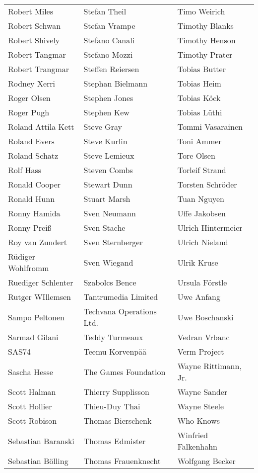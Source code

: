 \begin{small}
\begin{tabular}{p{4cm}p{4cm}p{4cm}}
Robert Miles & Stefan Theil & Timo Weirich \\
Robert Schwan & Stefan Vrampe & Timothy Blanks \\
Robert Shively & Stefano Canali & Timothy Henson \\
Robert Tangmar & Stefano Mozzi & Timothy Prater \\
Robert Trangmar & Steffen Reiersen & Tobias Butter \\
Rodney Xerri & Stephan Bielmann & Tobias Heim \\
Roger Olsen & Stephen Jones & Tobias Köck \\
Roger Pugh & Stephen Kew & Tobias Lüthi \\
Roland Attila Kett & Steve Gray & Tommi Vasarainen \\
Roland Evers & Steve Kurlin & Toni Ammer \\
Roland Schatz & Steve Lemieux & Tore Olsen \\
Rolf Hass & Steven Combs & Torleif Strand \\
Ronald Cooper & Stewart Dunn & Torsten Schröder \\
Ronald Hunn & Stuart Marsh & Tuan Nguyen \\
Ronny Hamida & Sven Neumann & Uffe Jakobsen \\
Ronny Preiß & Sven Stache & Ulrich Hintermeier \\
Roy van Zundert & Sven Sternberger & Ulrich Nieland \\
Rüdiger Wohlfromm & Sven Wiegand & Ulrik Kruse \\
Ruediger Schlenter & Szabolcs Bence & Ursula Förstle \\
Rutger WIllemsen & Tantrumedia Limited & Uwe Anfang \\
Sampo Peltonen & Techvana Operations Ltd. & Uwe Boschanski \\
Sarmad Gilani & Teddy Turmeaux & Vedran Vrbanc \\
SAS74 & Teemu Korvenpää & Verm Project \\
Sascha Hesse & The Games Foundation & Wayne Rittimann, Jr. \\
Scott Halman & Thierry Supplisson & Wayne Sander \\
Scott Hollier & Thieu-Duy Thai & Wayne Steele \\
Scott Robison & Thomas Bierschenk & Who Knows \\
Sebastian Baranski & Thomas Edmister & Winfried Falkenhahn \\
Sebastian Bölling & Thomas Frauenknecht & Wolfgang Becker \\

\end{tabular}
\end{small}
